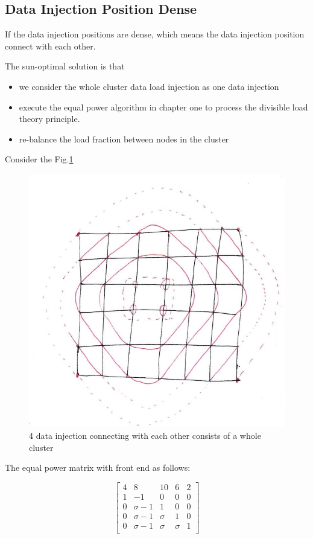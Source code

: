\subsection{Data Injection Position Dense}
If the data injection positions are dense, which means the data injection position connect with each other. 

\vspace*{15pt}

The sun-optimal solution is that

\begin{itemize}
\item we consider the whole cluster data load injection as one data injection 
\item execute the equal power algorithm in chapter one to process the divisible load theory principle.
\item re-balance the load fraction between nodes in the cluster
\end{itemize}

Consider the Fig.\ref{dense1}

\vspace*{15pt}

\begin{figure}[h]
\centering\includegraphics[width=0.8\linewidth]{figure/dense1}
\caption{4 data injection connecting with each other consists of a whole cluster}
\label{dense1}
\end{figure}

The equal power matrix with front end as follows:

\begin{equation}
{
\left[ \begin{array}{ccccc}
4 & 8 & 10 & 6 & 2 \\
1 & -1 & 0 & 0 & 0\\
0 & \sigma -1 & 1 & 0 & 0  \\
0 & \sigma -1 & \sigma & 1 & 0  \\
0 & \sigma -1 & \sigma & \sigma & 1  \\
\end{array} 
\right ]}  
\end{equation}


